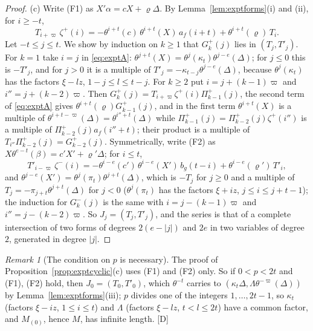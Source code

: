 \documentclass[11pt]{article}
\theoremstyle{definition}
\theoremstyle{remark}
\newtheorem{remark}{Remark}
\begin{document}
\begin{proof}
(c) Write (F1) as $X'\alpha=cX+\varrho\Delta$. By Lemma~\ref{lem:exptforms}(i) and (ii), for $i\ge-t$,
\begin{equation}\label{eq:exptA}
T_{i+\varpi}\,\zeta^+(i)=-\theta^{i+t}(c)\,\theta^{i+t}(X)\,a_f(i+t)+\theta^{i+t}(\varrho)\,T_i.
\end{equation}
Let $-t\le j\le t$. We show by induction on $k\ge1$ that $G^+_k(j)$ lies in $(T_j,T'_j)$. For $k=1$ take $i=j$ in \eqref{eq:exptA}: $\theta^{j+t}(X)=\theta^j(\kappa_t)\theta^{j-e}(\Delta)$; for $j\le0$ this is $-T'_j$, and for $j>0$ it is a multiple of $T'_j=-\kappa_{t-j}\theta^{j-e}(\Delta)$, because $\theta^j(\kappa_t)$ has the factors $\xi-lz$, $1-j\le l\le t-j$. For $k\ge2$ put $i=j+(k-1)\varpi$ and $i''=j+(k-2)\varpi$. Then $G^+_k(j)=T_{i+\varpi}\zeta^+(i)\Pi^+_{k-1}(j)$, the second term of \eqref{eq:exptA} gives $\theta^{i+t}(\varrho)G^+_{k-1}(j)$, and in the first term $\theta^{i+t}(X)$ is a multiple of $\theta^{i+t-\varpi}(\Delta)=\theta^{i''+t}(\Delta)$ while $\Pi^+_{k-1}(j)=\Pi^+_{k-2}(j)\zeta^+(i'')$ is a multiple of $\Pi^+_{k-2}(j)a_f(i''+t)$; their product is a multiple of $T_{i''}\Pi^+_{k-2}(j)=G^+_{k-2}(j)$. Symmetrically, write (F2) as $X\theta^{e-t}(\beta)=c'X'+\varrho'\Delta$; for $i\le t$,
\begin{equation}\label{eq:exptB}
T'_{i-\varpi}\,\zeta^-(i)=-\theta^{i-e}(c')\,\theta^{i-e}(X')\,b_g(t-i)+\theta^{i-e}(\varrho')\,T'_i,
\end{equation}
and $\theta^{j-e}(X')=\theta^j(\pi_t)\theta^{j+t}(\Delta)$, which is $-T_j$ for $j\ge0$ and a multiple of $T_j=-\pi_{j+t}\theta^{j+t}(\Delta)$ for $j<0$ ($\theta^j(\pi_t)$ has the factors $\xi+iz$, $j\le i\le j+t-1$); the induction for $G^-_k(j)$ is the same with $i=j-(k-1)\varpi$ and $i''=j-(k-2)\varpi$. So $J_j=(T_j,T'_j)$, and the series is that of a complete intersection of two forms of degrees $2(e-|j|)$ and $2e$ in two variables of degree $2$, generated in degree $|j|$.
\end{proof}

\begin{remark}[The condition on $p$ is necessary]\label{rem:exptp}
The proof of Proposition~\ref{prop:exptcyclic}(c) uses (F1) and (F2) only. So if $0<p<2t$ and (F1), (F2) hold, then $J_0=(T_0,T'_0)$, which $\theta^{-t}$ carries to $(\kappa_t\Delta,\Lambda\theta^{-\varpi}(\Delta))$ by Lemma~\ref{lem:exptforms}(iii); $p$ divides one of the integers $1,\dots,2t-1$, so $\kappa_t$ (factors $\xi-iz$, $1\le i\le t$) and $\Lambda$ (factors $\xi-lz$, $t<l\le2t$) have a common factor, and $M_{(0)}$, hence $M$, has infinite length. [D]
\end{remark}
\end{document}
